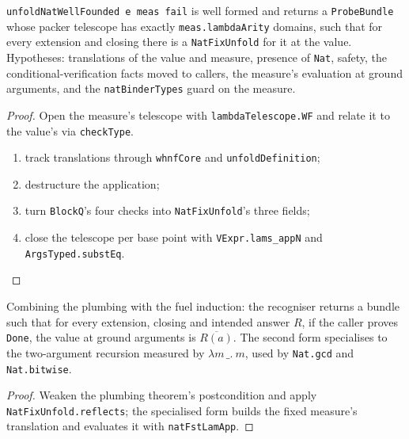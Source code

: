 \begin{theorem}
\label{vpc:thm:unfoldnatwf-prime}\leanok
{}

 \texttt{unfoldNatWellFounded e meas fail} is well formed and returns a
\texttt{ProbeBundle} whose packer telescope has exactly \texttt{meas.lambdaArity} domains, such
that for every extension and closing there is a \texttt{NatFixUnfold} for it at the value.
Hypotheses: translations of the value and measure, presence of \texttt{Nat}, safety, the
conditional-verification facts moved to callers, the measure's evaluation at ground arguments,
and the \texttt{natBinderTypes} guard on the measure.
\end{theorem}
\begin{proof}\leanok
{}
 Open the measure's telescope with \texttt{lambdaTelescope.WF} and relate it to the
value's via \texttt{checkType}. 
\begin{enumerate}
\item track translations through \texttt{whnfCore} and \texttt{unfoldDefinition};
\item destructure the application;
\item turn \texttt{BlockQ}'s four checks into \texttt{NatFixUnfold}'s three fields;
\item close the telescope per base point with \texttt{VExpr.lams\_appN} and
\texttt{ArgsTyped.substEq}.
\end{enumerate}
\end{proof}

\begin{theorem}
\label{vpc:thm:unfoldnatwf}
\leanok
{}

 Combining the plumbing with the fuel induction: the recogniser returns a bundle
such that for every extension, closing and intended answer $R$, if the caller proves
\texttt{Done}, the value at ground arguments is $\overline{R(a)}$.
The second form specialises to the two-argument recursion measured by $\lambda m\,\_.\ m$,
used by \texttt{Nat.gcd} and \texttt{Nat.bitwise}.
\end{theorem}
\begin{proof}\leanok
{}
 Weaken the plumbing theorem's postcondition and apply
\texttt{NatFixUnfold.reflects}; the specialised form builds the fixed measure's translation and
evaluates it with \texttt{natFstLamApp}.
\end{proof}


